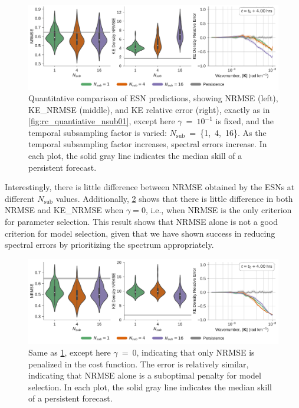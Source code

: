 \documentclass[draft]{agujournal2019}
\newcommand{\nsub}{N_\text{sub}}
\begin{document}
\begin{figure}
    \centering
    \includegraphics[width=\textwidth]{rc_all_gamma0.1.pdf}
    \caption{Quantitative comparison of ESN predictions, showing
        NRMSE (left), KE\_NRMSE (middle), and KE relative error (right), exactly as in
        \cref{fig:rc_quantiative_nsub01}, except here $\gamma$~=~$10^{-1}$ is fixed,
        and the temporal subsampling factor is varied: $\nsub$~=~\{1,~4,~16\}.
        As the temporal subsampling factor increases, spectral errors increase.
        In each plot, the solid gray line indicates the median skill of a persistent
        forecast.
    }
    \label{fig:rc_quantiative_gamma0.1}
\end{figure}

Interestingly, there is little difference between NRMSE obtained by the ESNs at
different $\nsub$ values.
Additionally, \cref{fig:rc_quantiative_gamma0.0} shows that there is little
difference in both NRMSE and KE\_NRMSE when $\gamma=0$, i.e., when NRMSE is the only criterion
for parameter selection.
This result shows that NRMSE alone is not a good criterion for model selection, given
that we have shown success in reducing spectral errors by prioritizing the spectrum appropriately.

\begin{figure}
    \centering
    \includegraphics[width=\textwidth]{rc_all_gamma0.0.pdf}
    \caption{Same as \cref{fig:rc_quantiative_gamma0.1}, except here $\gamma$~=~0,
        indicating that only NRMSE is penalized in the cost function.
        The error is relatively similar, indicating that NRMSE alone is a
        suboptimal penalty for model selection.
        In each plot, the solid gray line indicates the median skill of a persistent
        forecast.
    }
    \label{fig:rc_quantiative_gamma0.0}
\end{figure}
\end{document}
